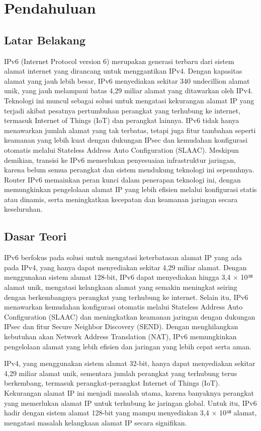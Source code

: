 \section{Pendahuluan}
\subsection{Latar Belakang}
IPv6 (Internet Protocol version 6) merupakan generasi terbaru dari sistem alamat internet yang dirancang untuk menggantikan IPv4. Dengan kapasitas alamat yang jauh lebih besar, IPv6 menyediakan sekitar 340 undecillion alamat unik, yang jauh melampaui batas 4,29 miliar alamat yang ditawarkan oleh IPv4. Teknologi ini muncul sebagai solusi untuk mengatasi kekurangan alamat IP yang terjadi akibat pesatnya pertumbuhan perangkat yang terhubung ke internet, termasuk Internet of Things (IoT) dan perangkat lainnya. IPv6 tidak hanya menawarkan jumlah alamat yang tak terbatas, tetapi juga fitur tambahan seperti keamanan yang lebih kuat dengan dukungan IPsec dan kemudahan konfigurasi otomatis melalui Stateless Address Auto Configuration (SLAAC). Meskipun demikian, transisi ke IPv6 memerlukan penyesuaian infrastruktur jaringan, karena belum semua perangkat dan sistem mendukung teknologi ini sepenuhnya. Router IPv6 memainkan peran kunci dalam penerapan teknologi ini, dengan memungkinkan pengelolaan alamat IP yang lebih efisien melalui konfigurasi statis atau dinamis, serta meningkatkan kecepatan dan keamanan jaringan secara keseluruhan.

\subsection{Dasar Teori}
IPv6 berfokus pada solusi untuk mengatasi keterbatasan alamat IP yang ada pada IPv4, yang hanya dapat menyediakan sekitar 4,29 miliar alamat. Dengan menggunakan sistem alamat 128-bit, IPv6 dapat menyediakan hingga 3,4 × 10³⁸ alamat unik, mengatasi kelangkaan alamat yang semakin meningkat seiring dengan berkembangnya perangkat yang terhubung ke internet. Selain itu, IPv6 menawarkan kemudahan konfigurasi otomatis melalui Stateless Address Auto Configuration (SLAAC) dan meningkatkan keamanan jaringan dengan dukungan IPsec dan fitur Secure Neighbor Discovery (SEND). Dengan menghilangkan kebutuhan akan Network Address Translation (NAT), IPv6 memungkinkan pengelolaan alamat yang lebih efisien dan jaringan yang lebih cepat serta aman. 

IPv4, yang menggunakan sistem alamat 32-bit, hanya dapat menyediakan sekitar 4,29 miliar alamat unik, sementara jumlah perangkat yang terhubung terus berkembang, termasuk perangkat-perangkat Internet of Things (IoT). Kekurangan alamat IP ini menjadi masalah utama, karena banyaknya perangkat yang memerlukan alamat IP untuk terhubung ke jaringan global. Untuk itu, IPv6 hadir dengan sistem alamat 128-bit yang mampu menyediakan 3,4 × 10³⁸ alamat, mengatasi masalah kelangkaan alamat IP secara signifikan.

